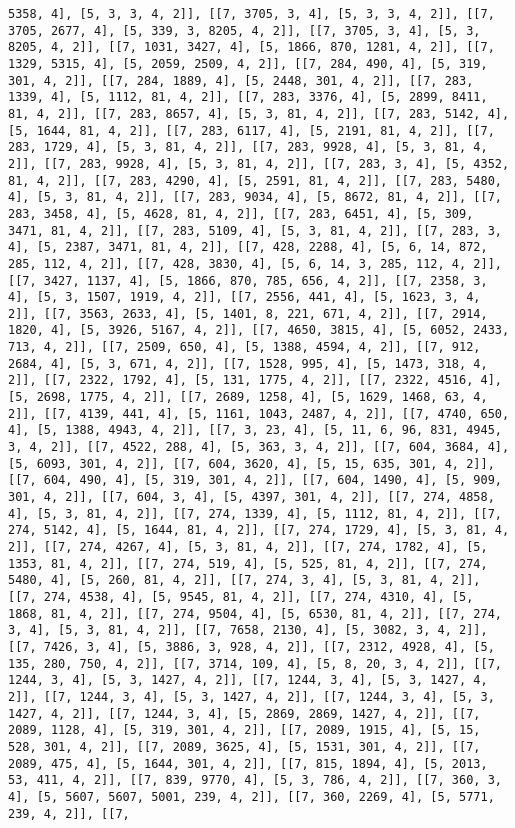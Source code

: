 \documentclass[12pt,fleqn]{article}\usepackage{../../common}
\begin{document}
\begin{verbatim}
5358, 4], [5, 3, 3, 4, 2]], [[7, 3705, 3, 4], [5, 3, 3, 4, 2]], [[7, 3705, 2677, 4], [5, 339, 3, 8205, 4, 2]], [[7, 3705, 3, 4], [5, 3, 8205, 4, 2]], [[7, 1031, 3427, 4], [5, 1866, 870, 1281, 4, 2]], [[7, 1329, 5315, 4], [5, 2059, 2509, 4, 2]], [[7, 284, 490, 4], [5, 319, 301, 4, 2]], [[7, 284, 1889, 4], [5, 2448, 301, 4, 2]], [[7, 283, 1339, 4], [5, 1112, 81, 4, 2]], [[7, 283, 3376, 4], [5, 2899, 8411, 81, 4, 2]], [[7, 283, 8657, 4], [5, 3, 81, 4, 2]], [[7, 283, 5142, 4], [5, 1644, 81, 4, 2]], [[7, 283, 6117, 4], [5, 2191, 81, 4, 2]], [[7, 283, 1729, 4], [5, 3, 81, 4, 2]], [[7, 283, 9928, 4], [5, 3, 81, 4, 2]], [[7, 283, 9928, 4], [5, 3, 81, 4, 2]], [[7, 283, 3, 4], [5, 4352, 81, 4, 2]], [[7, 283, 4290, 4], [5, 2591, 81, 4, 2]], [[7, 283, 5480, 4], [5, 3, 81, 4, 2]], [[7, 283, 9034, 4], [5, 8672, 81, 4, 2]], [[7, 283, 3458, 4], [5, 4628, 81, 4, 2]], [[7, 283, 6451, 4], [5, 309, 3471, 81, 4, 2]], [[7, 283, 5109, 4], [5, 3, 81, 4, 2]], [[7, 283, 3, 4], [5, 2387, 3471, 81, 4, 2]], [[7, 428, 2288, 4], [5, 6, 14, 872, 285, 112, 4, 2]], [[7, 428, 3830, 4], [5, 6, 14, 3, 285, 112, 4, 2]], [[7, 3427, 1137, 4], [5, 1866, 870, 785, 656, 4, 2]], [[7, 2358, 3, 4], [5, 3, 1507, 1919, 4, 2]], [[7, 2556, 441, 4], [5, 1623, 3, 4, 2]], [[7, 3563, 2633, 4], [5, 1401, 8, 221, 671, 4, 2]], [[7, 2914, 1820, 4], [5, 3926, 5167, 4, 2]], [[7, 4650, 3815, 4], [5, 6052, 2433, 713, 4, 2]], [[7, 2509, 650, 4], [5, 1388, 4594, 4, 2]], [[7, 912, 2684, 4], [5, 3, 671, 4, 2]], [[7, 1528, 995, 4], [5, 1473, 318, 4, 2]], [[7, 2322, 1792, 4], [5, 131, 1775, 4, 2]], [[7, 2322, 4516, 4], [5, 2698, 1775, 4, 2]], [[7, 2689, 1258, 4], [5, 1629, 1468, 63, 4, 2]], [[7, 4139, 441, 4], [5, 1161, 1043, 2487, 4, 2]], [[7, 4740, 650, 4], [5, 1388, 4943, 4, 2]], [[7, 3, 23, 4], [5, 11, 6, 96, 831, 4945, 3, 4, 2]], [[7, 4522, 288, 4], [5, 363, 3, 4, 2]], [[7, 604, 3684, 4], [5, 6093, 301, 4, 2]], [[7, 604, 3620, 4], [5, 15, 635, 301, 4, 2]], [[7, 604, 490, 4], [5, 319, 301, 4, 2]], [[7, 604, 1490, 4], [5, 909, 301, 4, 2]], [[7, 604, 3, 4], [5, 4397, 301, 4, 2]], [[7, 274, 4858, 4], [5, 3, 81, 4, 2]], [[7, 274, 1339, 4], [5, 1112, 81, 4, 2]], [[7, 274, 5142, 4], [5, 1644, 81, 4, 2]], [[7, 274, 1729, 4], [5, 3, 81, 4, 2]], [[7, 274, 4267, 4], [5, 3, 81, 4, 2]], [[7, 274, 1782, 4], [5, 1353, 81, 4, 2]], [[7, 274, 519, 4], [5, 525, 81, 4, 2]], [[7, 274, 5480, 4], [5, 260, 81, 4, 2]], [[7, 274, 3, 4], [5, 3, 81, 4, 2]], [[7, 274, 4538, 4], [5, 9545, 81, 4, 2]], [[7, 274, 4310, 4], [5, 1868, 81, 4, 2]], [[7, 274, 9504, 4], [5, 6530, 81, 4, 2]], [[7, 274, 3, 4], [5, 3, 81, 4, 2]], [[7, 7658, 2130, 4], [5, 3082, 3, 4, 2]], [[7, 7426, 3, 4], [5, 3886, 3, 928, 4, 2]], [[7, 2312, 4928, 4], [5, 135, 280, 750, 4, 2]], [[7, 3714, 109, 4], [5, 8, 20, 3, 4, 2]], [[7, 1244, 3, 4], [5, 3, 1427, 4, 2]], [[7, 1244, 3, 4], [5, 3, 1427, 4, 2]], [[7, 1244, 3, 4], [5, 3, 1427, 4, 2]], [[7, 1244, 3, 4], [5, 3, 1427, 4, 2]], [[7, 1244, 3, 4], [5, 2869, 2869, 1427, 4, 2]], [[7, 2089, 1128, 4], [5, 319, 301, 4, 2]], [[7, 2089, 1915, 4], [5, 15, 528, 301, 4, 2]], [[7, 2089, 3625, 4], [5, 1531, 301, 4, 2]], [[7, 2089, 475, 4], [5, 1644, 301, 4, 2]], [[7, 815, 1894, 4], [5, 2013, 53, 411, 4, 2]], [[7, 839, 9770, 4], [5, 3, 786, 4, 2]], [[7, 360, 3, 4], [5, 5607, 5607, 5001, 239, 4, 2]], [[7, 360, 2269, 4], [5, 5771, 239, 4, 2]], [[7, 
\end{verbatim}
\end{document}

